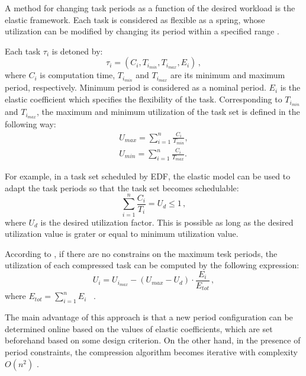 A method for changing task periods as a function of the desired workload is the elastic framework. Each task is considered as flexible as a spring, whose utilization can be modified by changing its period within a specified range 
\cite{lee2007handbook}.

Each task $\tau_i$ is detoned by:
\begin{equation*}
\tau_i = (C_i, T_{i_{min}}, T_{i_{max}}, E_i) \, ,
\end{equation*}
where $C_i$ is computation time, $T_{i_{min}}$ and $T_{i_{max}}$ are its minimum and maximum period, respectively.
Minimum period is considered as a nominal period. 
 $E_i$ is the elastic coefficient which specifies the flexibility of the task.
Corresponding to $T_{i_{min}}$ and $T_{i_{max}}$, the maximum and minimum utilization of the task set is defined in the following way:
\begin{align*}
U_{max} = \sum_{i=1}^{n}\frac{C_i}{T_{min}},\\
U_{min} = \sum_{i=1}^{n}\frac{C_i}{T_{max}}.
\end{align*}

For example, in a task set scheduled by EDF, the elastic model can be used to adapt the task periods so that the task set becomes schedulable:
\begin{equation*}
\sum_{i=1}^{n}\frac{C_i}{T_i} = U_d \leq 1 \, ,
\end{equation*}
where $U_d$ is the desired utilization factor.
This is possible as long as the desired utilization value is grater or equal to minimum utilization value.

According to \cite{lee2007handbook}, if there are no constrains on the maximum tesk periods, the utilization of each compressed task can be computed by the following expression:
\begin{equation*}
U_i = U_{i_{max}} - ( U_{max} - U_d ) \cdot \frac{E_i}{E_{tot}} \, ,
\end{equation*}
where \( E_{tot} = \sum_{i=1}^{n}E_i \) \, .

The main advantage of this approach is that a new period configuration can be determined online based on the values of elastic coefficients, which are set beforehand based on some design criterion.
On the other hand, in the presence of period constraints, the compression algorithm becomes iterative with complexity \( O(n^2) \) \cite{lee2007handbook}.

